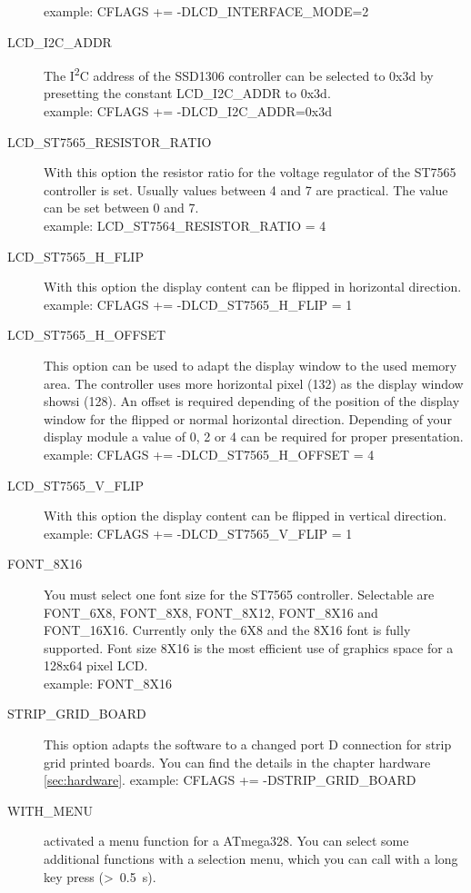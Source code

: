 \begin{description}
example: CFLAGS += -DLCD\_INTERFACE\_MODE=2
  \item[LCD\_I2C\_ADDR] The I\textsuperscript{2}C address of the SSD1306 controller can be selected to 0x3d by presetting
the constant LCD\_I2C\_ADDR to 0x3d.\\
example: CFLAGS += -DLCD\_I2C\_ADDR=0x3d
  \item[LCD\_ST7565\_RESISTOR\_RATIO] With this option the resistor ratio for the voltage regulator of
the ST7565 controller is set.
Usually values between 4 and 7 are practical.
The value can be set between 0 and 7.\\
example: LCD\_ST7564\_RESISTOR\_RATIO = 4
  \item[LCD\_ST7565\_H\_FLIP] With this option the display content can be flipped in horizontal direction.\\
example: CFLAGS += -DLCD\_ST7565\_H\_FLIP = 1
  \item[LCD\_ST7565\_H\_OFFSET] This option can be used to adapt the display window to the used memory area.
 The controller uses more horizontal pixel (132) as the display window showsi (128).
 An offset is required depending of the position of the display window for the flipped or normal horizontal direction.
 Depending of your display module a value of 0, 2 or 4 can be required for proper presentation.\\
example: CFLAGS += -DLCD\_ST7565\_H\_OFFSET = 4
  \item[LCD\_ST7565\_V\_FLIP] With this option the display content can be flipped in vertical direction.\\
example: CFLAGS += -DLCD\_ST7565\_V\_FLIP = 1
  \item[FONT\_8X16] You must select one font size for the ST7565 controller.
Selectable are FONT\_6X8, FONT\_8X8, FONT\_8X12, FONT\_8X16 and FONT\_16X16.
Currently only the 6X8 and the 8X16 font is fully supported.
Font size 8X16 is the most efficient use of graphics space for a 128x64 pixel LCD.\\
example: FONT\_8X16
  \item[STRIP\_GRID\_BOARD] This option adapts the software to a changed port D connection for strip grid printed boards.
You can find the details in the chapter hardware \ref{sec:hardware}.
example: CFLAGS += -DSTRIP\_GRID\_BOARD
  \item[WITH\_MENU] activated a menu function for a ATmega328. You can select some additional functions with a
selection menu, which you can call with a long key press (\textgreater~0.5~s).\\

\end{description}
